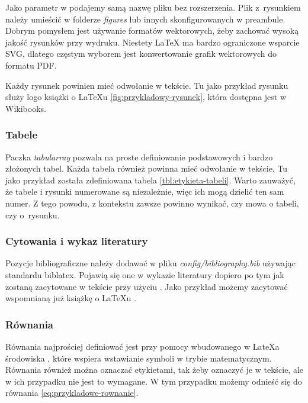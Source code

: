 Jako parametr w  podajemy samą
nazwę pliku bez rozszerzenia. Plik z~rysunkiem należy umieścić
w folderze \emph{figures} lub innych skonfigurowanych w preambule.
Dobrym pomysłem jest używanie formatów wektorowych, żeby zachować wysoką
jakość rysunków przy wydruku. Niestety LaTeX ma bardzo ograniczone
wsparcie SVG, dlatego częstym wyborem jest konwertowanie grafik
wektorowych do formatu PDF.

Każdy rysunek powinien mieć odwołanie w tekście. Tu jako przykład
rysunku służy logo książki o LaTeXu \ref{fig:przykladowy-rysunek}, która
dostępna jest w Wikibooks.

\subsubsection{Tabele}



Paczka \emph{tabularray} pozwala na proste definiowanie podstawowych
i bardzo złożonych tabel. Każda tabela również powinna mieć odwołanie
w tekście. Tu jako przykład została zdefiniowana tabela
\ref{tbl:etykieta-tabeli}. Warto zauważyć, że tabele i rysunki
numerowane są niezależnie, więc ich mogą dzielić ten sam numer. Z tego
powodu, z kontekstu zawsze powinno wynikać, czy mowa o tabeli, czy
o~rysunku.

\subsubsection{Cytowania i wykaz literatury}

Pozycje bibliograficzne należy dodawać w pliku
\emph{config/bibliography.bib} używając standardu biblatex. Pojawią się
one w wykazie literatury dopiero po tym jak zostaną zacytowane w tekście
przy użyciu . Jako przykład możemy zacytować
wspomnianą już książkę o LaTeXu \cite{book:latex}.

\subsubsection{Równania}

Równania najprościej definiować jest przy pomocy wbudowanego w LateXa
środowiska , które wspiera wstawianie
symboli w trybie matematycznym. Równania również można oznaczać
etykietami, tak żeby oznaczyć je w tekście, ale w ich przypadku nie jest
to wymagane. W tym przypadku możemy odnieść się do równania
\ref{eq:przykladowe-rownanie}.

